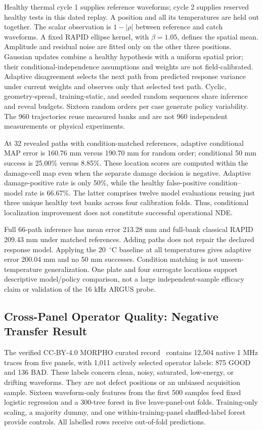 Healthy thermal cycle 1 supplies reference waveforms; cycle 2 supplies reserved
healthy tests in this dated replay. A position and all its temperatures are held out together.
The scalar observation is $1-|\rho|$ between reference and catch waveforms.
A fixed RAPID ellipse kernel, with $\beta=1.05$, defines the spatial mean.
Amplitude and residual noise are fitted only on the other three positions.
Gaussian updates combine a healthy hypothesis with a uniform spatial prior;
their conditional-independence assumptions and weights are not field-calibrated.
Adaptive disagreement selects the next path from predicted response variance
under current weights and observes only that selected test path. Cyclic,
geometry-spread, training-static, and seeded random sequences share inference
and reveal budgets. Sixteen random orders per case generate policy variability.
The 960 trajectories reuse measured banks and are not 960 independent
measurements or physical experiments.

At 32 revealed paths with condition-matched references, adaptive conditional
MAP error is 160.76 mm versus 190.70 mm for random order; conditional 50 mm
success is 25.00\% versus 8.85\%. These location scores are computed within the
damage-cell map even when the separate damage decision is negative. Adaptive
damage-positive rate is only 50\%, while the healthy false-positive
condition--model rate is 66.67\%. The latter comprises twelve model evaluations
reusing just three unique healthy test banks across four calibration folds.
Thus, conditional localization improvement does not constitute successful
operational NDE.

Full 66-path inference has mean error 213.28 mm and full-bank classical RAPID
209.43 mm under matched references. Adding paths does not repair the declared
response model. Applying the 20~$^{\circ}$C baseline at all temperatures gives
adaptive error 200.04 mm and no 50 mm successes. Condition matching is not
unseen-temperature generalization. One plate and four surrogate locations
support descriptive model/policy comparison, not a large independent-sample
efficacy claim or validation of the 16 kHz ARGUS probe.

\subsection{Cross-Panel Operator Quality: Negative Transfer Result}
The verified CC-BY-4.0 MORPHO curated record~\cite{stamatelatos2026morphodata}
contains 12,504 native 1 MHz traces from five panels, with 1,011 actively
selected operator labels: 875 GOOD and 136 BAD. These labels concern clean,
noisy, saturated, low-energy, or drifting waveforms. They are not defect
positions or an unbiased acquisition sample. Sixteen waveform-only features
from the first 500 samples feed fixed logistic regression and a 300-tree forest
in five leave-panel-out folds. Training-only scaling, a majority dummy, and
one within-training-panel shuffled-label forest provide controls. All labelled
rows receive out-of-fold predictions.


